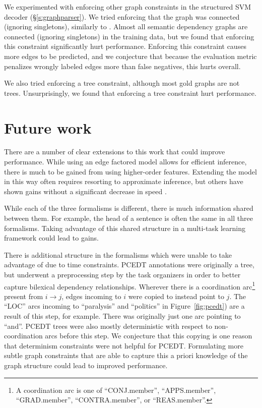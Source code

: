 \documentclass[11pt]{article}
\begin{document}
We experimented with enforcing other graph constraints in the structured SVM
decoder (\S\ref{s:graphparser}).
We tried enforcing that the graph was connected (ignoring singletons), similarly
to .
Almost all semantic dependency graphs are connected (ignoring singletons) in the
training data, but we found that enforcing this constraint significantly hurt
performance.
Enforcing this constraint causes more edges to be predicted, and we conjecture
that because the evaluation metric penalizes wrongly labeled edges more than
false negatives, this hurts overall.

We also tried enforcing a tree constraint, although most gold graphs are not
trees.
Unsurprisingly, we found that enforcing a tree constraint hurt performance.

\section{Future work}

There are a number of clear extensions to this work that could improve
performance.
While using an edge factored model allows for efficient inference, there is
much to be gained from using higher-order features.
Extending the model in this way often requires resorting to approximate
inference, but others have shown gains without a significant decrease in
speed \cite{mcdonald_online_2006,martins_turning_2013}.

While each of the three formalisms is different, there is much information
shared between them.
For example, the head of a sentence is often the same in all three formalisms.
Taking advantage of this shared structure in a multi-task learning framework
could lead to gains.

There is additional structure in the formalisms which were unable to take
advantage of due to time constraints.
PCEDT annotations were originally a tree, but underwent a preprocessing step by
the task organizers in order to better capture bilexical dependency
relationships.
Wherever there is a coordination arc\footnote{A coordination arc
is one of ``CONJ.member'', ``APPS.member'', ``GRAD.member'', ``CONTRA.member'',
or ``REAS.member''.} present from $i \rightarrow j$, edges incoming to $i$ were
copied to instead point to $j$.
The ``LOC'' arcs incoming to ``paralysis'' and ``politics'' in
Figure~\ref{fig:pcedt}) are a result of this step, for example.
There was originally just one arc pointing to ``and''.
PCEDT trees were also mostly deterministic with respect to non-coordination arcs
before this step.
We conjecture that this copying is one reason that determinism constraints were
not helpful for PCEDT.
Formulating more subtle graph constraints that are able to capture this a priori
knowledge of the graph structure could lead to improved performance.
\end{document}

